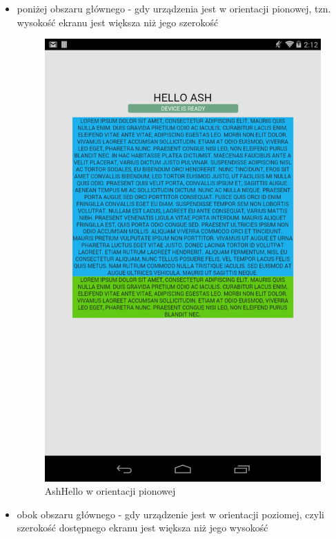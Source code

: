 \documentclass[brudnopis]{xmgr}
\begin{document}
\begin{itemize}
  \item poniżej obszaru głównego - gdy urządzenia jest w orientacji pionowej, tzn. wysokość ekranu jest większa niż jego szerokość

\begin{figure}[p]
    \centering
    \includegraphics[scale=0.25]{hello1.png}
    \caption{AshHello w orientacji pionowej}
    \label{fig:AshHello1}
\end{figure}

  \item obok obszaru głównego - gdy urządzenie jest w orientacji poziomej, czyli szerokość dostępnego ekranu jest większa niż jego wysokość 


\end{itemize}
\end{document}
